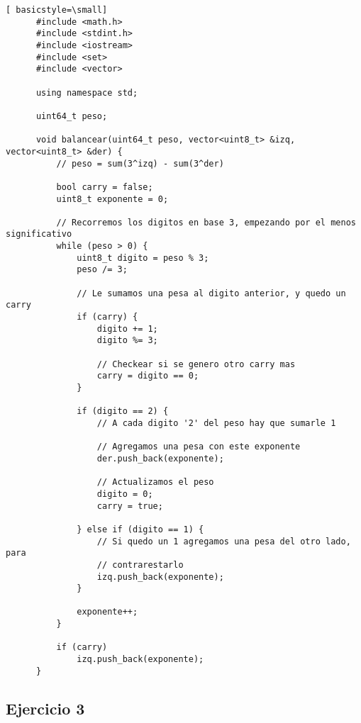 \begin{lstlisting}[ basicstyle=\small]
      #include <math.h>
      #include <stdint.h>
      #include <iostream>
      #include <set>
      #include <vector>

      using namespace std;

      uint64_t peso;

      void balancear(uint64_t peso, vector<uint8_t> &izq, vector<uint8_t> &der) {
          // peso = sum(3^izq) - sum(3^der)

          bool carry = false;
          uint8_t exponente = 0;

          // Recorremos los digitos en base 3, empezando por el menos significativo
          while (peso > 0) {
              uint8_t digito = peso % 3;
              peso /= 3;

              // Le sumamos una pesa al digito anterior, y quedo un carry
              if (carry) {
                  digito += 1;
                  digito %= 3;

                  // Checkear si se genero otro carry mas
                  carry = digito == 0;
              }

              if (digito == 2) {
                  // A cada digito '2' del peso hay que sumarle 1

                  // Agregamos una pesa con este exponente
                  der.push_back(exponente);

                  // Actualizamos el peso
                  digito = 0;
                  carry = true;

              } else if (digito == 1) {
                  // Si quedo un 1 agregamos una pesa del otro lado, para
                  // contrarestarlo
                  izq.push_back(exponente);
              }

              exponente++;
          }

          if (carry)
              izq.push_back(exponente);
      }
\end{lstlisting}

\newpage
\subsection{Ejercicio 3}

